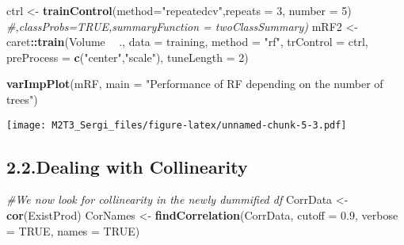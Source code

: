 \documentclass[]{article}
\newenvironment{Shaded}{\begin{snugshade}}{\end{snugshade}}
\newcommand{\CommentTok}[1]{\textcolor[rgb]{0.56,0.35,0.01}{\textit{#1}}}
\newcommand{\DataTypeTok}[1]{\textcolor[rgb]{0.13,0.29,0.53}{#1}}
\newcommand{\DecValTok}[1]{\textcolor[rgb]{0.00,0.00,0.81}{#1}}
\newcommand{\FloatTok}[1]{\textcolor[rgb]{0.00,0.00,0.81}{#1}}
\newcommand{\KeywordTok}[1]{\textcolor[rgb]{0.13,0.29,0.53}{\textbf{#1}}}
\newcommand{\NormalTok}[1]{#1}
\newcommand{\OperatorTok}[1]{\textcolor[rgb]{0.81,0.36,0.00}{\textbf{#1}}}
\newcommand{\OtherTok}[1]{\textcolor[rgb]{0.56,0.35,0.01}{#1}}
\newcommand{\StringTok}[1]{\textcolor[rgb]{0.31,0.60,0.02}{#1}}
\begin{document}
\begin{Shaded}
\begin{Highlighting}[]
\NormalTok{ctrl <-}\StringTok{ }\KeywordTok{trainControl}\NormalTok{(}\DataTypeTok{method=}\StringTok{"repeatedcv"}\NormalTok{,}\DataTypeTok{repeats =} \DecValTok{3}\NormalTok{, }\DataTypeTok{number =} \DecValTok{5}\NormalTok{) }\CommentTok{#,classProbs=TRUE,summaryFunction = twoClassSummary)}
\NormalTok{mRF2 <-}\StringTok{ }\NormalTok{caret}\OperatorTok{::}\KeywordTok{train}\NormalTok{(Volume }\OperatorTok{~}\StringTok{ }\NormalTok{., }\DataTypeTok{data =}\NormalTok{ training, }\DataTypeTok{method =} \StringTok{"rf"}\NormalTok{, }\DataTypeTok{trControl =}\NormalTok{ ctrl, }\DataTypeTok{preProcess =} \KeywordTok{c}\NormalTok{(}\StringTok{"center"}\NormalTok{,}\StringTok{"scale"}\NormalTok{), }\DataTypeTok{tuneLength =} \DecValTok{2}\NormalTok{)}

\KeywordTok{varImpPlot}\NormalTok{(mRF, }\DataTypeTok{main =} \StringTok{"Performance of RF depending on the number of trees"}\NormalTok{)}
\end{Highlighting}
\end{Shaded}

\texttt{[image: M2T3\_Sergi\_files/figure-latex/unnamed-chunk-5-3.pdf]}

\begin{Shaded}
\end{Shaded}

\hypertarget{dealing-with-collinearity}{%
\subsection{2.2.Dealing with
Collinearity}\label{dealing-with-collinearity}}

\begin{Shaded}
\begin{Highlighting}[]
\CommentTok{#We now look for collinearity in the newly dummified df}
\NormalTok{CorrData <-}\StringTok{ }\KeywordTok{cor}\NormalTok{(ExistProd)}
\NormalTok{CorNames <-}\StringTok{ }\KeywordTok{findCorrelation}\NormalTok{(CorrData, }\DataTypeTok{cutoff =} \FloatTok{0.9}\NormalTok{, }\DataTypeTok{verbose =} \OtherTok{TRUE}\NormalTok{, }\DataTypeTok{names =} \OtherTok{TRUE}\NormalTok{)}
\end{Highlighting}
\end{Shaded}
\end{document}
